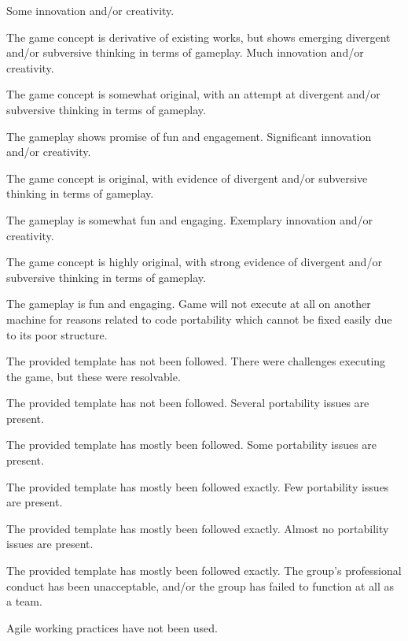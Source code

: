 \documentclass{../fal_assignment}
\begin{document}
\begin{markingrubric}
        \grade Some innovation and/or creativity.
            \par The game concept is derivative of existing works, but shows emerging divergent and/or subversive thinking in terms of gameplay.
        \grade Much innovation and/or creativity.
            \par The game concept is somewhat original, with an attempt at divergent and/or subversive thinking in terms of gameplay.
            \par The gameplay shows promise of fun and engagement.
        \grade Significant innovation and/or creativity.
            \par The game concept is original, with evidence of divergent and/or subversive thinking in terms of gameplay.
            \par The gameplay is somewhat fun and engaging.
        \grade Exemplary innovation and/or creativity.
            \par The game concept is highly original, with strong evidence of divergent and/or subversive thinking in terms of gameplay.
            \par The gameplay is fun and engaging.
        \grade\fail Game will not execute at all on another machine for reasons related to code portability which cannot be fixed easily due to its poor structure.
            \par The provided template has not been followed.
        \grade There were challenges executing the game, but these were resolvable.
            \par The provided template has not been followed.
        \grade Several portability issues are present.
            \par The provided template has mostly been followed.
        \grade Some portability issues are present.
            \par The provided template has mostly been followed exactly.
        \grade Few portability issues are present.
            \par The provided template has mostly been followed exactly.
        \grade Almost no portability issues are present.
            \par The provided template has mostly been followed exactly.
        \grade\fail The group's professional conduct has been unacceptable,
            and/or the group has failed to function at all as a team.
            \par Agile working practices have not been used.

\end{markingrubric}
\end{document}
